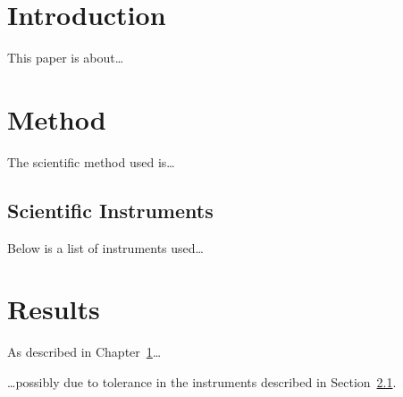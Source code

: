 \documentclass[a4paper]{report}
\begin{document}
\chapter{Introduction}\label{ch:introduction}
This paper is about\ldots

\chapter{Method}
The scientific method used is\ldots

\section{Scientific Instruments}\label{sec:instruments}
Below is a list of instruments used\ldots

\chapter{Results}
As described in Chapter~\ref{ch:introduction}\ldots

\ldots possibly due to tolerance in the instruments
described in Section~\ref{sec:instruments}.
\end{document}
